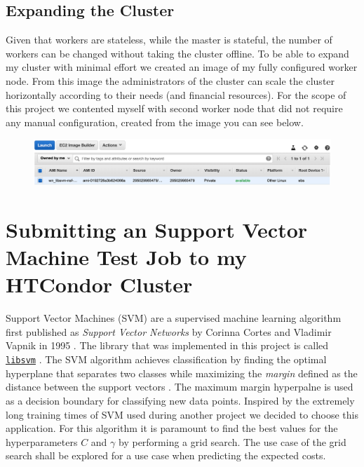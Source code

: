 \documentclass{article}
\begin{document}
\subsection{Expanding the Cluster}
Given that workers are stateless, while the master is stateful, the number of workers can be changed without taking the cluster offline.
To be able to expand my cluster with minimal effort we created an image of my fully configured worker node.
From this image the administrators of the cluster can scale the cluster horizontally according to their needs (and financial resources).
For the scope of this project we contented myself with second worker node that did not require any manual configuration, created from the image you can see below.
\begin{figure}[!h]
    \center%
    \includegraphics[width=\textwidth]{img/wn_image.png}
\end{figure}

\section{Submitting an Support Vector Machine Test Job to my HTCondor Cluster}
Support Vector Machines (SVM) are a supervised machine learning algorithm first published as \textit{Support Vector Networks} by Corinna Cortes and Vladimir Vapnik in 1995 \cite{cortes_support-vector_1995}. The library that was implemented in this project  is called \href{https://www.csie.ntu.edu.tw/~cjlin/libsvm/}{\texttt{libsvm}} \cite{chang_libsvm_2011}.
The SVM algorithm achieves classification by finding the optimal hyperplane that separates two classes while maximizing the \textit{margin} defined as the distance between the support vectors \cite{gholami_chapter_2017}.
The maximum margin hyperpalne is used as a decision boundary for classifying new data points.
Inspired by the extremely long training times of SVM used during another project we decided to choose this application. 
For this algorithm it is paramount to find the best values for the hyperparameters $C$ and $\gamma$ by performing a grid search.
The use case of the grid search shall be explored for a use case when predicting the expected costs. %
\end{document}
